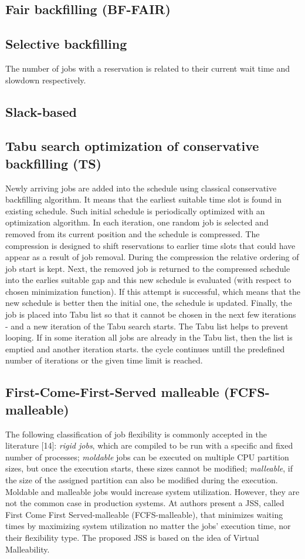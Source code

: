 \documentclass[a4paper,10pt]{article}
\begin{document}
\subsection{Fair backfilling (BF-FAIR)}
\subsection{Selective backfilling}
The number of jobs with a reservation is related to their current wait time and slowdown respectively.
\cite{Backfilling}
\subsection{Slack-based}
\subsection{Tabu search optimization of conservative backfilling (TS)}
Newly arriving jobs are added into the schedule using classical conservative backfilling algorithm. It means that the earliest suitable time slot is found in existing schedule. Such initial schedule is periodically optimized with an optimization algorithm. In each iteration, one random job is selected and removed from its current position and the schedule is compressed. The compression is designed to shift reservations to earlier time slots that could have appear as a result of job removal. During the compression the relative ordering of job start is kept. Next, the removed job is returned to the compressed schedule into the earlies suitable gap and this new schedule is evaluated (with respect to chosen minimization function). If this attempt is successful, which means that the new schedule is better then the initial one, the schedule is updated. Finally, the job is placed into Tabu list so that it cannot be chosen in the next few iterations - and a new iteration of the Tabu search starts. The Tabu list helps to prevent looping.  If in some iteration all jobs are already in the Tabu list, then the list is emptied and another iteration starts. the cycle continues untill the predefined number of iterations or the given time limit is reached. \cite{Rudova 2012}
\subsection{First-Come-First-Served malleable (FCFS-malleable)}
The following classification of job flexibility is commonly accepted in the literature [14]: \textit{rigid jobs}, which are compiled to be run with a specific and fixed number of processes; \textit{moldable} jobs can be executed on multiple CPU partition sizes, but once the execution starts, these sizes cannot be modified; \textit{malleable}, if the size of the assigned partition can also be modified during the execution. 
Moldable and malleable jobs would increase system utilization. However, they are not the common case in production systems. At \cite{FCFS-malleable}  authors present a JSS, called First Come First Served-malleable (FCFS-malleable), that minimizes waiting times by maximizing system utilization no matter the jobs' execution time, nor their flexibility type. The proposed JSS is based on the idea
of Virtual Malleability.
\end{document}
